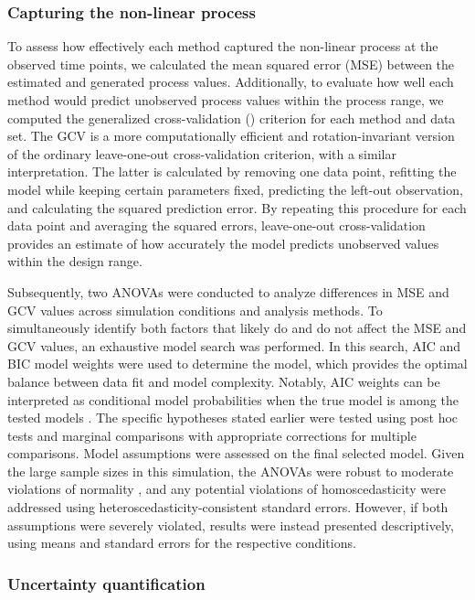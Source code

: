 \documentclass[man, floatsintext]{apa7}
\begin{document}
\subsubsection{Capturing the non-linear process}

To assess how effectively each method captured the non-linear process at the
observed time points, we calculated the mean squared error (MSE) between the
estimated and generated process values. Additionally,
to evaluate how well each method
would predict unobserved process values within the process range, we computed
the generalized cross-validation (\parencite[GCV;][]{golub_generalized_1979})
criterion
for each method and data set. The GCV is a more computationally efficient and
rotation-invariant version of the ordinary leave-one-out cross-validation
criterion, with a similar interpretation. The latter is calculated by removing
one data point, refitting the
model while keeping certain parameters fixed, predicting the left-out
observation, and calculating the squared
prediction error. By repeating this procedure for each data point and averaging
the squared errors, leave-one-out cross-validation provides an estimate of
how accurately the model
predicts unobserved values within the design range.

Subsequently, two ANOVAs were conducted to analyze differences in MSE and GCV
values across simulation conditions and analysis methods. To simultaneously
identify both factors that likely
do and do not affect the MSE and GCV values, an exhaustive model search was
performed. In this search, AIC and BIC model weights were used to determine the
model, which provides the optimal balance between data fit and model
complexity. Notably, AIC weights can
be interpreted as conditional model probabilities when the true model is among
the tested models \parencite{wagenmakers_aic_2004}. The specific hypotheses
stated earlier
were tested using post hoc tests and marginal comparisons with appropriate
corrections for multiple comparisons.
Model assumptions were assessed on the final selected model. Given
the large sample sizes in this simulation, the ANOVAs were robust to moderate
violations of normality \parencite{blanca_non-normal_2017},
and any potential violations of homoscedasticity were
addressed using heteroscedasticity-consistent standard errors. However, if both
assumptions were severely violated, results were instead presented
descriptively, using means and standard errors for the respective conditions.

\subsubsection{Uncertainty quantification}
\end{document}
